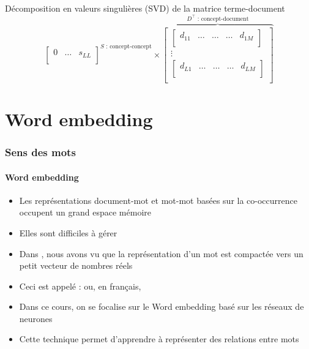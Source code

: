 \documentclass[xcolor=table]{beamer}
\begin{document}
\begin{frame}
\begin{block}{Décomposition en valeurs singulières (SVD) de la matrice terme-document}
\[{\begin{bmatrix}
			0 & \ldots & s_{LL} \\
			\end{bmatrix}
		}^{S \text{ : concept-concept}}
		\times 
		\overbrace{
			\begin{bmatrix}
			\begin{bmatrix}
			d_{11} & \ldots & \ldots & \ldots & d_{1M} \\
			\end{bmatrix}\\
			\vdots \\
			\begin{bmatrix}
			d_{L1} & \ldots & \ldots & \ldots & d_{LM} \\
			\end{bmatrix}\\
			\end{bmatrix}
		}^{D^\top \text{ : concept-document}}
		\]
		
	\end{block}
	
\end{frame}


\section{Word embedding}

\begin{frame}
\frametitle{Sens des mots}
\framesubtitle{Word embedding}

\begin{itemize}
	\item Les représentations document-mot et mot-mot basées sur la co-occurrence occupent un grand espace mémoire 
	\item Elles sont difficiles à gérer 
	\item Dans , nous avons vu que la représentation d'un mot est compactée vers un petit vecteur de nombres réels
	\item Ceci est appelé :  ou, en français, 
	\item Dans ce cours, on se focalise sur le Word embedding basé sur les réseaux de neurones
	\item Cette technique permet d'apprendre à représenter des relations entre mots
\end{itemize}

\end{frame}
\end{document}

